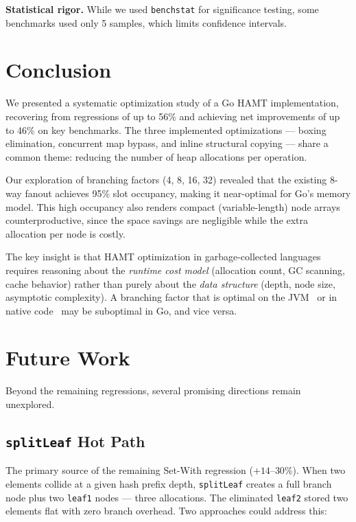 \documentclass[11pt,twocolumn]{article}
\begin{document}
\textbf{Statistical rigor.}
While we used \texttt{benchstat} for significance testing, some benchmarks
used only 5 samples, which limits confidence intervals.

\section{Conclusion}
\label{sec:conclusion}

We presented a systematic optimization study of a Go HAMT implementation,
recovering from regressions of up to 56\% and achieving net improvements of
up to 46\% on key benchmarks.
The three implemented optimizations --- boxing elimination, concurrent map
bypass, and inline structural copying --- share a common theme: reducing
the number of heap allocations per operation.

Our exploration of branching factors (4, 8, 16, 32) revealed that the
existing 8-way fanout achieves 95\% slot occupancy, making it near-optimal
for Go's memory model.
This high occupancy also renders compact (variable-length) node arrays
counterproductive, since the space savings are negligible while the extra
allocation per node is costly.

The key insight is that HAMT optimization in garbage-collected languages
requires reasoning about the \emph{runtime cost model} (allocation count,
GC scanning, cache behavior) rather than purely about the \emph{data
structure} (depth, node size, asymptotic complexity).
A branching factor that is optimal on the JVM~\cite{steindorfer2015} or in
native code~\cite{bagwell2001} may be suboptimal in Go, and vice versa.

\section{Future Work}
\label{sec:future}

Beyond the remaining regressions, several promising directions remain
unexplored.

\subsection{\texttt{splitLeaf} Hot Path}

The primary source of the remaining Set-With regression ($+14$--$30\%$).
When two elements collide at a given hash prefix depth, \texttt{splitLeaf}
creates a full branch node plus two \texttt{leaf1} nodes --- three
allocations.
The eliminated \texttt{leaf2} stored two elements flat with zero branch
overhead.
Two approaches could address this:
\end{document}
